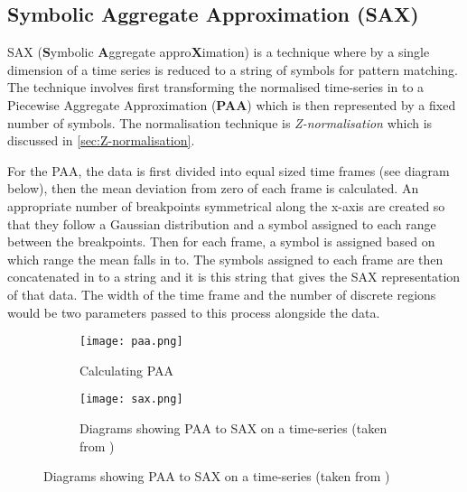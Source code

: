 \documentclass[../report.tex]{subfiles}
\begin{document}
	
	\subsection{Symbolic Aggregate Approximation (SAX)} \label{sec:paasax}
	SAX (\textbf{S}ymbolic \textbf{A}ggregate appro\textbf{X}imation) \citep{sax} is a technique where by a single dimension of a time series is reduced to a string of symbols for pattern matching.  The technique involves first transforming the normalised time-series in to a Piecewise Aggregate Approximation (\textbf{PAA}) which is then represented by a fixed number of symbols.  The normalisation technique is \textit{Z-normalisation} which is discussed in \cref{sec:Z-normalisation}.
	
	For the PAA, the data is first divided into equal sized time frames (see diagram below), then the mean deviation from zero of each frame is calculated.  An appropriate number of breakpoints symmetrical along the x-axis are created so that they follow a Gaussian distribution and a symbol assigned to each range between the breakpoints.  Then for each frame, a symbol is assigned based on which range the mean falls in to.  The symbols assigned to each frame are then concatenated in to a string and it is this string that gives the SAX representation of that data.  The width of the time frame and the number of discrete regions would be two parameters passed to this process alongside the data.
	\begin{figure}[h]
		\begin{subfigure}{0.5\linewidth}
			\texttt{[image: paa.png]}
			\caption{Calculating PAA}
		\end{subfigure}
		\begin{subfigure}{0.5\linewidth}
			\texttt{[image: sax.png]}
			\caption{Diagrams showing PAA to SAX on a time-series (taken from \cite{sax})}
		\end{subfigure}
	\end{figure}
\end{document}
